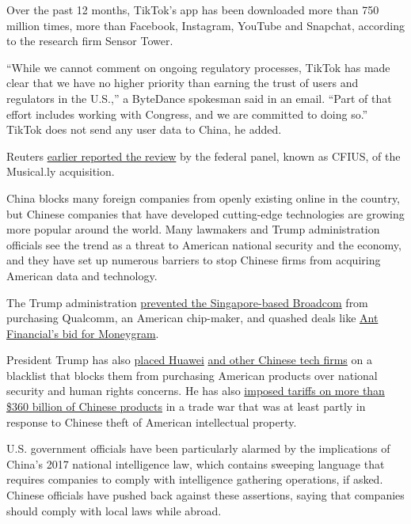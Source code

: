 Over the past 12 months, TikTok's app has been downloaded more than 750
million times, more than Facebook, Instagram, YouTube and Snapchat,
according to the research firm Sensor Tower.

``While we cannot comment on ongoing regulatory processes, TikTok has
made clear that we have no higher priority than earning the trust of
users and regulators in the U.S.,'' a ByteDance spokesman said in an
email. ``Part of that effort includes working with Congress, and we are
committed to doing so.'' TikTok does not send any user data to China, he
added.

Reuters
\href{https://www.reuters.com/article/us-tiktok-cfius-exclusive/exclusive-u-s-opens-national-security-investigation-into-tiktok-sources-idUSKBN1XB4IL}{earlier
reported the review} by the federal panel, known as CFIUS, of the
Musical.ly acquisition.

China blocks many foreign companies from openly existing online in the
country, but Chinese companies that have developed cutting-edge
technologies are growing more popular around the world. Many lawmakers
and Trump administration officials see the trend as a threat to American
national security and the economy, and they have set up numerous
barriers to stop Chinese firms from acquiring American data and
technology.

The Trump administration
\href{https://www.nytimes.com/2018/03/12/technology/trump-broadcom-qualcomm-merger.html}{prevented
the Singapore-based Broadcom} from purchasing Qualcomm, an American
chip-maker, and quashed deals like
\href{https://www.nytimes.com/2018/01/02/business/moneygram-ant-financial-china-cfius.html}{Ant
Financial's bid for Moneygram}.

President Trump has also
\href{https://www.nytimes.com/2019/05/16/technology/huawei-ban-president-trump.html}{placed
Huawei}
\href{https://www.nytimes.com/2019/10/07/us/politics/us-to-blacklist-28-chinese-entities-over-abuses-in-xinjiang.html}{and
other Chinese tech firms} on a blacklist that blocks them from
purchasing American products over national security and human rights
concerns. He has also
\href{https://www.nytimes.com/2019/10/08/us/politics/trump-trade-war-imf.html}{imposed
tariffs on more than \$360 billion of Chinese products} in a trade war
that was at least partly in response to Chinese theft of American
intellectual property.

U.S. government officials have been particularly alarmed by the
implications of China's 2017 national intelligence law, which contains
sweeping language that requires companies to comply with intelligence
gathering operations, if asked. Chinese officials have pushed back
against these assertions, saying that companies should comply with local
laws while abroad.

